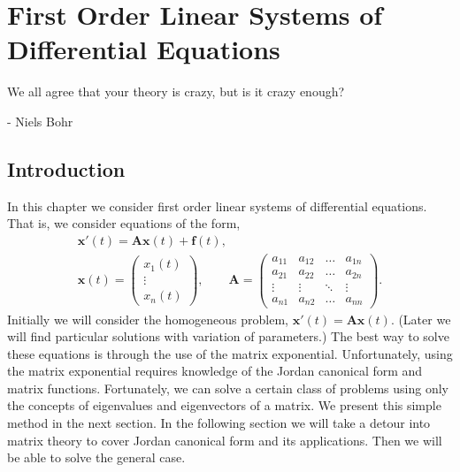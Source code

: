 \flushbottom




\chapter{First Order Linear Systems of Differential Equations}



We all agree that your theory is crazy, but is it crazy enough?

\begin{flushright}
  - Niels Bohr 
\end{flushright}




\section{Introduction}





In this chapter we consider first order linear systems of differential 
equations.  That is, we consider equations of the form,
\begin{gather*}
  \mathbf{x}'(t) = \mathbf{A} \mathbf{x}(t) + \mathbf{f}(t),
  \\
  \mathbf{x}(t) = \begin{pmatrix} x_1(t) \\ \vdots \\ x_n(t) \end{pmatrix},
  \qquad
  \mathbf{A} = 
  \begin{pmatrix}
    a_{11}       & a_{12}     & \ldots        &a_{1n} \\
    a_{21}       & a_{22}     & \ldots        &a_{2n} \\
    \vdots          & \vdots        & \ddots        & \vdots \\
    a_{n1}       & a_{n2}     & \ldots        &a_{nn}
  \end{pmatrix}.
\end{gather*}
Initially we will consider the homogeneous problem, 
$\mathbf{x}'(t) = \mathbf{A} \mathbf{x}(t)$.  (Later we will find particular solutions with 
variation of parameters.)  The best way to solve these equations is through
the use of the matrix exponential.  Unfortunately, using the matrix 
exponential requires knowledge of the Jordan canonical form and matrix 
functions.  Fortunately, we can solve a certain class of problems using 
only the concepts of eigenvalues and eigenvectors of a matrix.  We present
this simple method in the next section.  In the following section
we will take a detour into
matrix theory to cover Jordan canonical form and its applications.  Then
we will be able to solve the general case.









